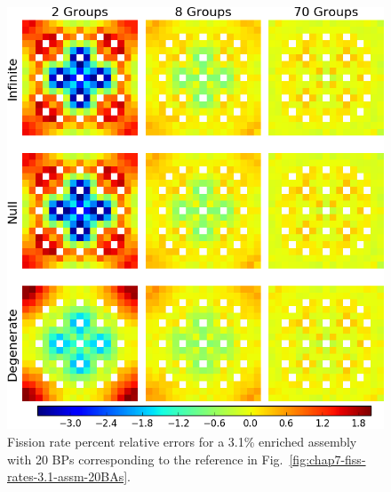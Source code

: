 \begin{appendices}
\begin{figure}[h!]
\centering
\includegraphics[width=\linewidth]{figures/quantification/appendix/assm-31-20BPs/fiss-err}
\vspace{2mm}
\caption[Fission rate errors for a 3.1\% enriched assembly with 20 BPs]{Fission rate percent relative errors for a 3.1\% enriched assembly with 20 BPs corresponding to the reference in Fig.~\ref{fig:chap7-fiss-rates-3.1-assm-20BAs}.}
\label{fig:quantify-assm-3.1-20BPs-fiss-err}
\end{figure}

\clearpage


\end{appendices}

